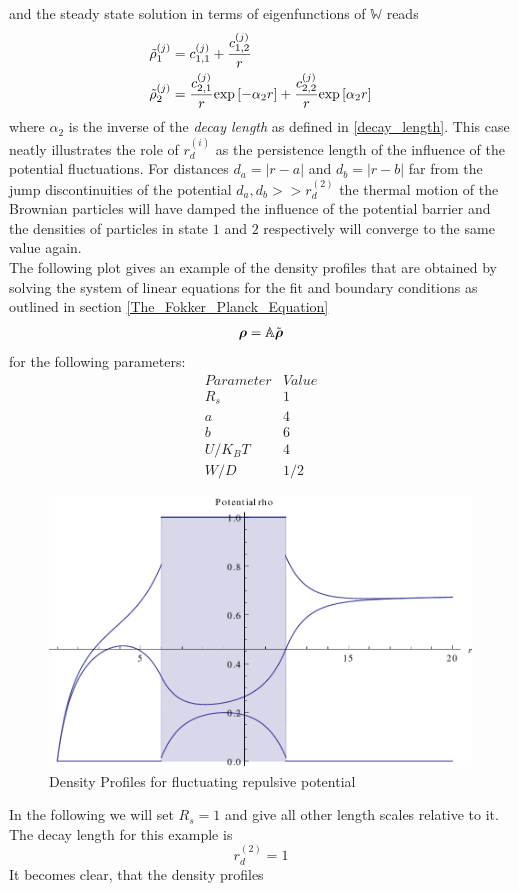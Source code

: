 and the steady state solution in terms of eigenfunctions of $\mathbb{W}$ reads
\begin{align}
    \tilde{\rho}_1^{(j)} &= c_{1,1}^{(j)} + \frac{c_{1,2}^{(j)}}{r} \\
    \tilde{\rho}_2^{(j)} &= \frac{c_{2,1}^{(j)}}{r}{\rm exp}\left[-\alpha_2r\right]+ \frac{c_{2,2}^{(j)}}{r}{\rm exp}\left[\alpha_2 r\right]
    \label{ind_sol_U2}
\end{align}
where $\alpha_2$ is the inverse of the \textit{decay length} as defined in \eqref{decay_length}. This case neatly illustrates the role of $r_d^{(i)}$ as the persistence length of the influence of the potential fluctuations. For distances $d_a = |r - a|$ and $d_b = |r - b|$ far from the jump discontinuities of the potential $d_a, d_b >> r_d^{(2)}$ the thermal motion of the Brownian particles will have damped the influence of the potential barrier and the densities of particles in state $1$ and $2$ respectively will converge to the same value again.\\
The following plot gives an example of the density profiles that are obtained by solving the system of linear equations for the fit and boundary conditions as outlined in section \ref{The_Fokker_Planck_Equation}
\begin{equation}
    \boldsymbol{\mathbf{\rho}} = \mathbb{A} \tilde{\boldsymbol{\mathbf{\rho}}}
\end{equation}
for the following parameters:
\begin{equation}
    \begin{array}{r|l}
        Parameter & Value \\ \hline
        R_s & 1 \\
        a   & 4 \\
        b   & 6 \\
        U/K_B T & 4 \\
        W/D & 1/2
    \end{array} \nonumber
    \label{Parameters}
\end{equation}
\begin{figure}[H]
    \centering
    \includegraphics[width = .9 \textwidth]{plots/rho.pdf}
    \caption{Density Profiles for fluctuating repulsive potential}
    \label{fig:rho}
\end{figure}
In the following we will set $R_s = 1$ and give all other length scales relative to it.
\newpage
The decay length for this example is 
\begin{equation}
    r_d^{(2)} = 1
\end{equation}
It becomes clear, that the density profiles 
